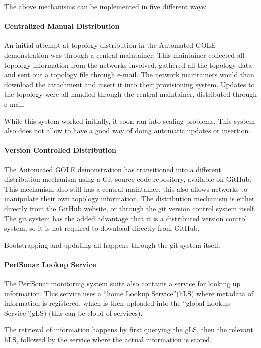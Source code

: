\documentclass[12pt]{article}  %
\begin{document}
 The above mechanisms can be implemented in five different ways:


\paragraph{Centralized Manual Distribution}
 An initial attempt at topology distribution in the Automated GOLE 
demonstration was through a central maintainer. This maintainer collected all topology 
information from the networks involved, gathered all the topology data and sent 
out a topology file through e-mail. The network maintainers would than download 
the attachment and insert it into their provisioning system. Updates to the topology 
were all handled through the central maintainer, distributed through e-mail.


While this system worked initially, it soon ran into 
scaling problems. This system also does not allow to have a good way of doing automatic 
updates or insertion.


\paragraph{Version Controlled Distribution}

 The Automated GOLE demonstration has transitioned into a different 
distribution mechanism using a Git source code repository, available on GitHub. 
This mechanism also still has a central maintainer, this also allows networks to 
manipulate their own topology information. The distribution mechanism is either 
directly from the GitHub website, or through the git version control system itself. 
The git system has the added advantage that it is a distributed version control 
system, so it is not required to download directly from GitHub.


Bootstrapping and updating all happens through the 
git system itself.


\paragraph{PerfSonar Lookup Service}

 The PerfSonar monitoring system suite also contains a service 
for looking up information. This service uses a ``home Lookup Service''(hLS) where 
metadata of information is registered, which is then uploaded into the ``global 
Lookup Service''(gLS) (this can be cloud of services).


The retrieval of information happens by first querying 
the gLS, then the relevant hLS, followed by the service where the actual information 
is stored.
\end{document}
